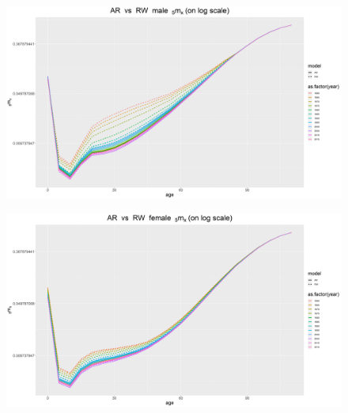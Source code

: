 \documentclass[12pt,a4paper]{article}
\begin{document}
\newpage
\begin{figure}[H]
\includegraphics[width=\linewidth]{Burkina Faso/2/compare RW males year.png}
\end{figure}
\begin{figure}[H]
\includegraphics[width=\linewidth]{Burkina Faso/2/compare RW females year.png}
\end{figure}
\end{document}
